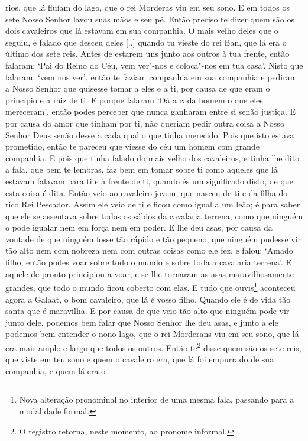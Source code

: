 rios, que lá fluíam do lago, que o rei Morderas viu em seu sono. E em todos os
sete Nosso Senhor lavou suas mãos e seu pé. Então preciso te dizer quem são os
dois cavaleiros que lá estavam em sua companhia. O mais velho deles que o
seguiu, é falado que desceu deles [..] quando tu vieste do rei Ban, que lá era
o último dos sete reis. Antes de estarem uns junto aos outros à tua frente,
então falaram: ‘Pai do Reino do Céu, vem ver"-nos e coloca"-nos em tua casa’.
Nisto que falaram, ‘vem nos ver’, então te faziam companhia em sua companhia e
pediram a Nosso Senhor que quisesse tomar a eles e a ti, por causa de que eram
o princípio e a raiz de ti. E porque falaram ‘Dá a cada homem o que eles
mereceram’, então podes perceber que nunca ganharam entre si senão justiça. E
por causa do amor que tinham por ti, não queriam pedir outra coisa a Nosso
Senhor Deus senão desse a cada qual o que tinha merecido. Pois que isto estava
prometido, então te pareceu que viesse do céu um homem com grande companhia. E
pois que tinha falado do mais velho dos cavaleiros, e tinha lhe dito a fala,
que bem te lembras, faz bem em tomar sobre ti como aqueles que lá estavam
falavam para ti e à frente de ti, quando és um significado disto, de que esta
coisa é dita. Então veio ao cavaleiro jovem, que nasceu de ti e da filha do
rico Rei Pescador. Assim ele veio de ti e ficou como igual a um leão; é para
saber que ele se assentava sobre todos os sábios da cavalaria terrena, como que
ninguém o pode igualar nem em força nem em poder. E lhe deu asas, por causa da
vontade de que ninguém fosse tão rápido e tão pequeno, que ninguém pudesse vir
tão alto nem com nobreza nem com outras coisas como ele fez, e falou: ‘Amado
filho, então podes voar sobre todo o mundo e sobre toda a cavalaria terrena’. E
aquele de pronto principiou a voar, e se lhe tornaram as asas maravilhosamente
grandes, que todo o mundo ficou coberto com elas. E tudo que ouvis\footnote{
Nova alteração pronominal no interior de uma mesma fala, passando para a
modalidade formal.}  aconteceu agora a Galaat, o bom cavaleiro, que
lá é vosso filho. Quando ele é de vida tão santa que é maravilha. E por causa
de que veio tão alto que ninguém pode vir junto dele, podemos bem falar que
Nosso Senhor lhe deu asas, e junto a ele podemos bem entender o nono lago, que
o rei Morderans viu em seu sono, que lá era mais amplo e largo que todos os
outros. Então te\footnote{ O registro retorna, neste momento, ao pronome
informal.}  disse quem são os sete reis, que viste em teu sono e
quem o cavaleiro era, que lá foi empurrado de sua companhia, e quem lá era o
